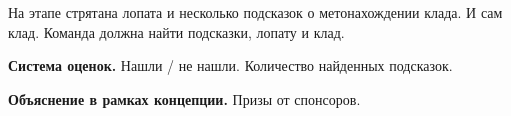 
\par На этапе стрятана лопата и несколько подсказок о метонахождении клада. И сам клад. Команда должна найти подсказки, лопату и клад.

\par \textbf{Система оценок.} Нашли / не нашли. Количество найденных подсказок.

\par \textbf{Объяснение в рамках концепции.} Призы от спонсоров.